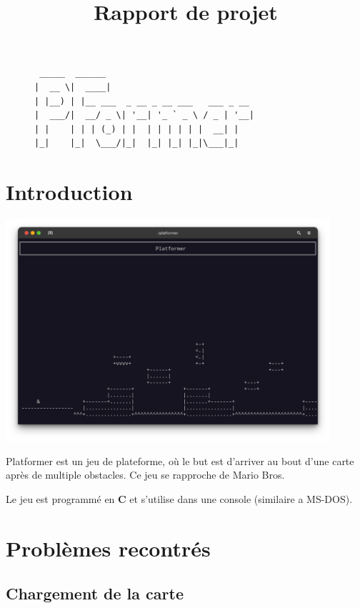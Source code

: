 \documentclass[12pt]{article}
\title{Rapport de projet}
\begin{document}
\maketitle
\begin{figure}[H]
	\centering
	\begin{BVerbatim}
 _____  ______                               
|  __ \|  ____|                             
| |__) | |__ ___  _ __ _ __ ___   ___ _ __   
|  ___/|  __/ _ \| '__| '_ ` _ \ / _ | '__|
| |    | | | (_) | |  | | | | | |  __| |     
|_|    |_|  \___/|_|  |_| |_| |_|\___|_|   
	\end{BVerbatim}
\end{figure}
\tableofcontents
\newpage

\section{Introduction}

\begin{center}
	\includegraphics[width=0.90\textwidth]{content/image.png}
\end{center}

Platformer est un jeu de plateforme, où le but est d'arriver au bout d'une carte après de multiple obstacles. Ce jeu se rapproche de Mario Bros.

Le jeu est programmé en \textbf{C} et s'utilise dans une console (similaire a MS-DOS).

\section{Problèmes recontrés}

	\subsection{Chargement de la carte}
	
\end{document}
